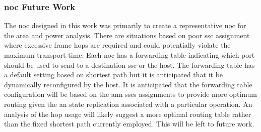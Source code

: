 \iffalse
\vspace{-10mm}
\begin{alignat}{2} 
  \text{NoC port bandwidth} & = \frac{b_i}{t_c} \notag \\
                                    & = \frac{64}{\num{2d-9}} =  \SI[per-mode=symbol]{32}{\giga \bit \per \second}  \label{eq:rawPortBandwidth}\\
  \text{where } &b_i \text{ is the number of data bits per \ac{noc} interface} \notag \\
                &t_c \text{ is the cycle time} \notag
\end{alignat}
\vspace{-10mm}
\begin{alignat}{2} 
  \text{Raw mesh bandwidth} & = \frac{N_s \cdot b_i}{t_c} \notag \\
                                    & = \frac{8 \cdot 64}{\num{2d-9}} =  \SI[per-mode=symbol]{256}{\giga \bit \per \second} \label{eq:rawMeshBandwidth} \\
  \text{where } &N_s \text{ number of \acp{ssc} assigned to an \ac{ann}} \notag \\
                &b_i \text{ is the number of data bits per \ac{noc} interface} \notag \\
                &t_c \text{ is the cycle time} \notag
\end{alignat}
\fi

\subsubsection{\ac{noc} Future Work}
\label{sec:NoC future work}

The \ac{noc} designed in this work was primarily to create a representative \ac{noc} for the area and power analysis.
There are situations based on poor \ac{ssc} assignment where excessive frame hops are required and could potentially violate the maximum transport time.
Each \ac{noc} has a forwarding table indicating which port should be used to send to a destination \ac{ssc} or the host.
The forwarding table has a default setting based on shortest path but it is anticipated that it be dynamically reconfigured by the host.
It is anticipated that the forwarding table configuration will be based on the \ac{ann} \acp{ssc} assignments to provide more optimum routing given the \ac{an} state replication associated with a particular operation.
An analysis of the hop usage will likely suggest a more optimal routing table rather than the fixed shortest path currently employed. This will be left to future work.


